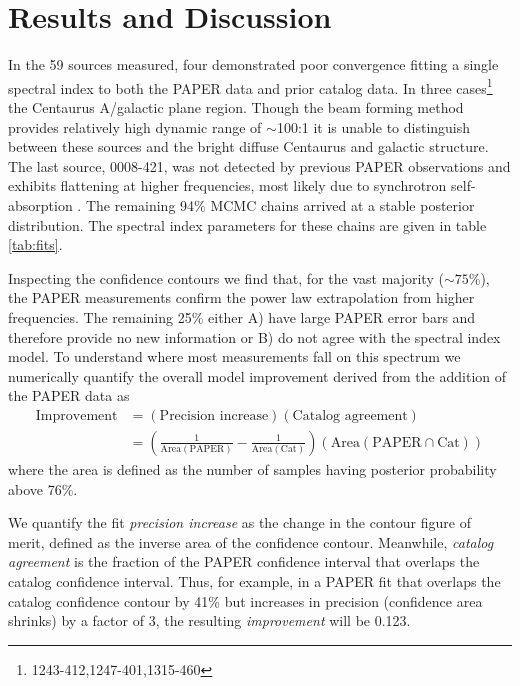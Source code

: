 \documentclass[preprint]{aastex}
\newcommand{\PAPER}{\mathrm{PAPER}}
\begin{document}
\section{Results and Discussion}
\label{sec:fits}
In the 59 sources measured, four demonstrated poor convergence fitting a single
spectral index to both the PAPER data and prior catalog data. In three
cases\footnote{1243-412,1247-401,1315-460} %
the Centaurus A/galactic plane region. Though the beam forming method provides
relatively high dynamic range of $\sim$100:1 it is unable to distinguish
between these sources and the bright diffuse Centaurus and galactic structure.
The last source, 0008-421, was not detected by previous PAPER observations and
exhibits flattening at higher frequencies, most likely due to synchrotron
self-absorption \citep{Jacobs:2011p8438} .  The remaining 94\% MCMC chains
arrived at a stable posterior distribution. The spectral index parameters for
these chains are given in table \ref{tab:fits}.

Inspecting the confidence contours we find that, for the vast majority ($\sim
75$\%), the PAPER measurements confirm the power law extrapolation from higher
frequencies. The remaining 25\% either A) have large PAPER error bars and
therefore provide no new information or B) do not agree with the spectral index
model.  To understand where most measurements fall on this spectrum we
numerically quantify the overall model improvement derived from the addition of
the PAPER data as 
\begin{align}
\textrm{Improvement} &= \left(\textrm{Precision increase}\right) \left(\textrm{Catalog agreement}\right)\\
&= \left(\frac{1}{\textrm{Area}(\textrm{PAPER})} - \frac{1}{\textrm{Area}(\textrm{Cat})}\right) \left( \textrm{Area}(\PAPER \cap \textrm{Cat}) \right)
\end{align}
where the area is defined as the number of samples having posterior probability above 76\%.

We quantify the fit {\em precision increase} as the change in the contour
figure of merit, defined as the inverse area of the confidence contour.
Meanwhile, {\em catalog agreement} is the fraction of the PAPER confidence
interval that overlaps the catalog confidence interval.  Thus, for example, in
a PAPER fit that overlaps the catalog confidence contour by 41\% but increases
in precision (confidence area shrinks) by a factor of 3, the resulting {\em
improvement} will be 0.123.  
\end{document}
